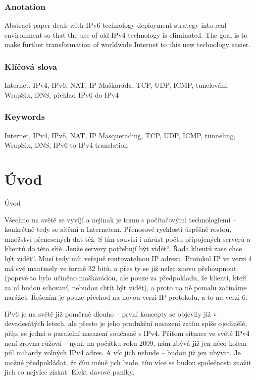 \documentclass[12pt]{report}
\newcommand{\kapitola}[1]{
	\refstepcounter{chapter}
	\lhead{\thechapter. #1}
	\rhead{Michal Zima}
	\typeout{\chaptername\space\thechapter.}
	\chapter*{\protect\thechapter\hspace{0.75em} #1}
	\addcontentsline{toc}{chapter} {
		\protect\numberline{\thechapter}#1
	}
}
\newcommand\uv[1]{\quotedblbase #1\textquotedblleft}
\begin{document}
\subsection*{Anotation}
Abstract paper deals with IPv6 technology deployment strategy into real environment so that the use of old IPv4 technology is eliminated. The goal is to make further transformation of worldwide Internet to this new technology easier.

\subsection*{Klíčová slova}
Internet, IPv4, IPv6, NAT, IP Maškaráda, TCP, UDP, ICMP, tunelování, WrapSix, DNS, překlad IPv6 do IPv4

\subsection*{Keywords}
Internet, IPv4, IPv6, NAT, IP Masquerading, TCP, UDP, ICMP, tunneling, WrapSix, DNS, IPv6 to IPv4 translation
\newpage{}

\tableofcontents
\newpage

\kapitola{Úvod}
Všechno na světě se vyvíjí a nejinak je tomu s počítačovými technologiemi -- konkrétně tedy se sítěmi a Internetem. Přenosové rychlosti úspěšně rostou, množství přenesených dat též. S tím souvisí i nárůst počtu připojených serverů a klientů do této sítě. Jenže servery potřebují \uv{být vidět}. Řada klientů zase chce \uv{být vidět}. Musí tedy mít veřejně routovatelnou IP adresu. Protokol IP ve verzi 4 má své mantinely ve formě 32 bitů, a přes ty se již nelze znovu přehoupnout (poprvé to bylo učiněno maškarádou, ale pouze za předpokladu, že klienti, kteří za ní budou schovaní, nebudou chtít být vidět), a proto na ně pomalu začínáme narážet. Řešením je pouze přechod na novou verzi IP protokolu, a to na verzi 6.

IPv6 je na světě již poměrně dlouho -- první koncepty se objevily již v devadesátých letech, ale přesto je jeho produkční nasazení zatím spíše ojedinělé, příp. se jedná o paralelní nasazení současně s IPv4. Přitom situace ve světě IPv4 není zrovna růžová -- nyní, na počátku roku 2009, nám zbývá již jen něco kolem půl miliardy volných IPv4 adres. A víc jich nebude -- budou již jen ubývat. Je možné předpokládat, že čím méně jich bude, tím více se budou společnosti snažit jich co nejvíce získat. Efekt davové paniky.
\end{document}
